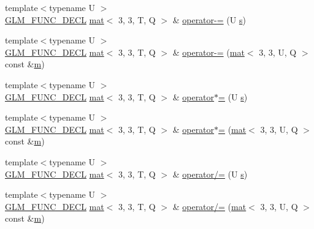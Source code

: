 \begin{DoxyCompactItemize}
\item 
{\footnotesize template$<$typename U $>$ }\\\hyperlink{setup_8hpp_ab2d052de21a70539923e9bcbf6e83a51}{G\+L\+M\+\_\+\+F\+U\+N\+C\+\_\+\+D\+E\+CL} \hyperlink{structglm_1_1mat}{mat}$<$ 3, 3, T, Q $>$ \& \hyperlink{structglm_1_1mat_3_013_00_013_00_01_t_00_01_q_01_4_aed487ca4202482113e6399e7c63e2707}{operator-\/=} (U \hyperlink{_s_d_l__opengl_8h_a4af680a6c683f88ed67b76f207f2e6e4}{s})
\item 
{\footnotesize template$<$typename U $>$ }\\\hyperlink{setup_8hpp_ab2d052de21a70539923e9bcbf6e83a51}{G\+L\+M\+\_\+\+F\+U\+N\+C\+\_\+\+D\+E\+CL} \hyperlink{structglm_1_1mat}{mat}$<$ 3, 3, T, Q $>$ \& \hyperlink{structglm_1_1mat_3_013_00_013_00_01_t_00_01_q_01_4_a9774d11e0033307ef6b4161b7cad2984}{operator-\/=} (\hyperlink{structglm_1_1mat}{mat}$<$ 3, 3, U, Q $>$ const \&\hyperlink{_s_d_l__opengl__glext_8h_af593500c283bf1a787a6f947f503a5c2}{m})
\item 
{\footnotesize template$<$typename U $>$ }\\\hyperlink{setup_8hpp_ab2d052de21a70539923e9bcbf6e83a51}{G\+L\+M\+\_\+\+F\+U\+N\+C\+\_\+\+D\+E\+CL} \hyperlink{structglm_1_1mat}{mat}$<$ 3, 3, T, Q $>$ \& \hyperlink{structglm_1_1mat_3_013_00_013_00_01_t_00_01_q_01_4_af0528228c4f85b75447e923cebd99c2c}{operator$\ast$=} (U \hyperlink{_s_d_l__opengl_8h_a4af680a6c683f88ed67b76f207f2e6e4}{s})
\item 
{\footnotesize template$<$typename U $>$ }\\\hyperlink{setup_8hpp_ab2d052de21a70539923e9bcbf6e83a51}{G\+L\+M\+\_\+\+F\+U\+N\+C\+\_\+\+D\+E\+CL} \hyperlink{structglm_1_1mat}{mat}$<$ 3, 3, T, Q $>$ \& \hyperlink{structglm_1_1mat_3_013_00_013_00_01_t_00_01_q_01_4_adf6080b0295fc39579a981adc573dd66}{operator$\ast$=} (\hyperlink{structglm_1_1mat}{mat}$<$ 3, 3, U, Q $>$ const \&\hyperlink{_s_d_l__opengl__glext_8h_af593500c283bf1a787a6f947f503a5c2}{m})
\item 
{\footnotesize template$<$typename U $>$ }\\\hyperlink{setup_8hpp_ab2d052de21a70539923e9bcbf6e83a51}{G\+L\+M\+\_\+\+F\+U\+N\+C\+\_\+\+D\+E\+CL} \hyperlink{structglm_1_1mat}{mat}$<$ 3, 3, T, Q $>$ \& \hyperlink{structglm_1_1mat_3_013_00_013_00_01_t_00_01_q_01_4_a479948bc42b53782519ebebf64ff44a3}{operator/=} (U \hyperlink{_s_d_l__opengl_8h_a4af680a6c683f88ed67b76f207f2e6e4}{s})
\item 
{\footnotesize template$<$typename U $>$ }\\\hyperlink{setup_8hpp_ab2d052de21a70539923e9bcbf6e83a51}{G\+L\+M\+\_\+\+F\+U\+N\+C\+\_\+\+D\+E\+CL} \hyperlink{structglm_1_1mat}{mat}$<$ 3, 3, T, Q $>$ \& \hyperlink{structglm_1_1mat_3_013_00_013_00_01_t_00_01_q_01_4_a1ba66548bf8173db17de0de94807d918}{operator/=} (\hyperlink{structglm_1_1mat}{mat}$<$ 3, 3, U, Q $>$ const \&\hyperlink{_s_d_l__opengl__glext_8h_af593500c283bf1a787a6f947f503a5c2}{m})

\end{DoxyCompactItemize}

